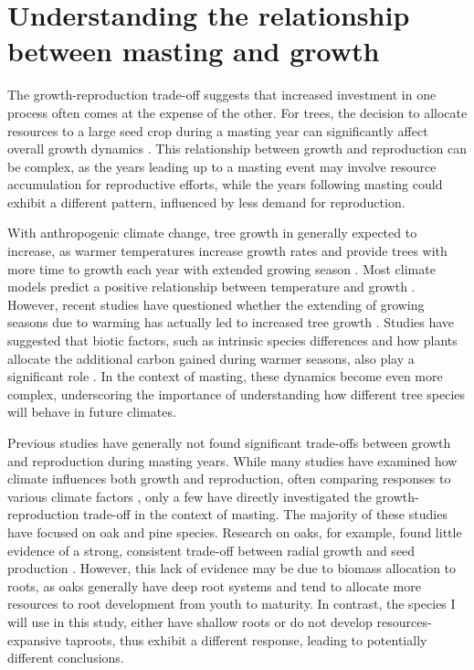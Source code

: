 \documentclass[11pt,letter]{article}
\begin{document}
\section{Understanding the relationship between masting and growth}
The growth-reproduction trade-off suggests that increased investment in one process often comes at the expense of the other. For trees, the decision to allocate resources to a large seed crop during a masting year can significantly affect overall growth dynamics \citep{hacket2016tree}. This relationship between growth and reproduction can be complex, as the years leading up to a masting event may involve resource accumulation for reproductive efforts, while the years following masting could exhibit a different pattern, influenced by less demand for reproduction.\par
With anthropogenic climate change, tree growth in generally expected to increase, as warmer temperatures increase growth rates and provide trees with more time to growth each year with extended growing season \citep{keenan2014net, finzi2020carbon}. Most climate models predict a positive relationship between temperature and growth \citep{ito2020global, friedlingstein2022global}. However, recent studies have questioned whether the extending of growing seasons due to warming has actually led to increased tree growth \citep{dow2022warm, green2022limits}. Studies have suggested that biotic factors, such as intrinsic species differences and how plants allocate the additional carbon gained during warmer seasons, also play a significant role \citep{hacket2016consistent}. In the context of masting,  these dynamics become even more complex, underscoring the importance of understanding how different tree species will behave in future climates.\par
Previous studies have generally not found significant trade-offs between growth and reproduction during masting years. While many studies have examined how climate influences both growth and reproduction, often comparing responses to various climate factors \citep{koenig2020can, bajocco2021characterizing, redmond2019resource, sanchez2011trade}, only a few have directly investigated the growth-reproduction trade-off in the context of masting. The majority of these studies have focused on oak and pine species. Research on oaks, for example, found little evidence of a strong, consistent trade-off between radial growth and seed production \citep{koenig2020can, patterson2023acorn}. However, this lack of evidence may be due to biomass allocation to roots, as oaks generally have deep root systems and tend to allocate more resources to root development from youth to maturity. In contrast, the species I will use in this study, either have shallow roots or do not develop resources-expansive taproots, thus exhibit a different response, leading to potentially different conclusions.\par
\end{document}

